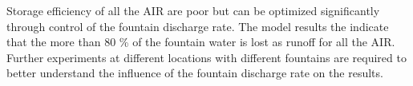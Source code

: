 \documentclass[utf8]{frontiersSCNS} %
\begin{document}
Storage efficiency of all the AIR are poor but can be optimized significantly through control of the fountain discharge
rate.  The model results the indicate that the more than 80 \% of the fountain water is lost as runoff for all the AIR.
Further experiments at different locations with different fountains are required to better understand the influence of
the fountain discharge rate on the results.



\end{document}

